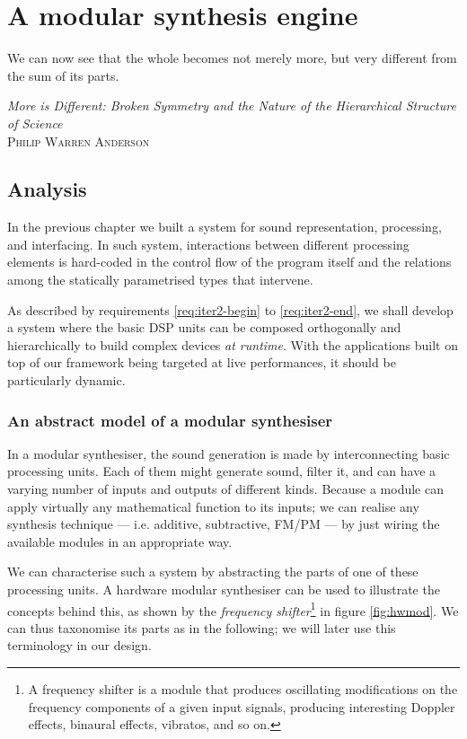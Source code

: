 
\chapter{A modular synthesis engine}
\label{sec:04-graph}

\epigraph{We can now see that the whole becomes not merely more, but
  very different from the sum of its parts.}{\emph{More is Different:
  Broken Symmetry and the Nature of the Hierarchical Structure of
  Science}\\\textsc{Philip Warren Anderson}}

\section{Analysis}

In the previous chapter we built a system for sound representation,
processing, and interfacing. In such system, interactions
between different processing elements is hard-coded in the control
flow of the program itself and the relations among the statically
parametrised types that intervene.

As described by requirements \ref{req:iter2-begin} to
\ref{req:iter2-end}, we shall develop a system where the basic DSP
units can be composed orthogonally and hierarchically to build complex
devices \emph{at runtime}. With the applications built on top of our
framework being targeted at live performances, it should be
particularly dynamic.

\subsection{An abstract model of a modular synthesiser}

In a modular synthesiser, the sound generation is made by
interconnecting basic processing units. Each of them might generate
sound, filter it, and can have a varying number of inputs and outputs
of different kinds. Because a module can apply virtually any
mathematical function to its inputs; we can realise any synthesis
technique --- i.e. additive, subtractive, FM/PM --- by just wiring the
available modules in an appropriate way.

We can characterise such a system by abstracting the parts of one of
these processing units. A hardware modular synthesiser can be used to
illustrate the concepts behind this, as shown by the \emph{frequency
  shifter}\footnote{A frequency shifter is a module that produces
  oscillating modifications on the frequency components of a given
  input signals, producing interesting Doppler effects, binaural
  effects, vibratos, and so on.} in figure \ref{fig:hwmod}. We can thus
taxonomise its parts as in the following; we will later use this
terminology in our design.

